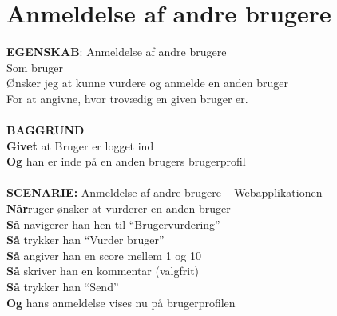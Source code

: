 \section{Anmeldelse af andre brugere}
{\color{blue}\textbf{EGENSKAB}:} Anmeldelse af andre brugere \\
Som bruger \\
Ønsker  jeg at kunne vurdere og anmelde en anden bruger \\
For at angivne, hvor trovædig en given bruger er.\\ \\
{\color{blue}\textbf{BAGGRUND}} \\
{\color{blue}\textbf{Givet}} at Bruger er logget ind \\
{\color{blue}\textbf{Og}} han er inde på en anden brugers brugerprofil\\\\
{\color{blue}\textbf{SCENARIE:}} Anmeldelse af andre brugere – Webapplikationen \\
{\color{blue}\textbf{Når}}ruger ønsker at vurderer en anden bruger\\
{\color{blue}\textbf{Så}} navigerer han hen til “Brugervurdering”\\
{\color{blue}\textbf{Så}} trykker han “Vurder bruger”\\
{\color{blue}\textbf{Så}} angiver han en score mellem 1 og 10\\
{\color{blue}\textbf{Så}} skriver han en kommentar (valgfrit)\\
{\color{blue}\textbf{Så}} trykker han “Send”\\
{\color{blue}\textbf{Og}} hans anmeldelse vises nu på brugerprofilen



